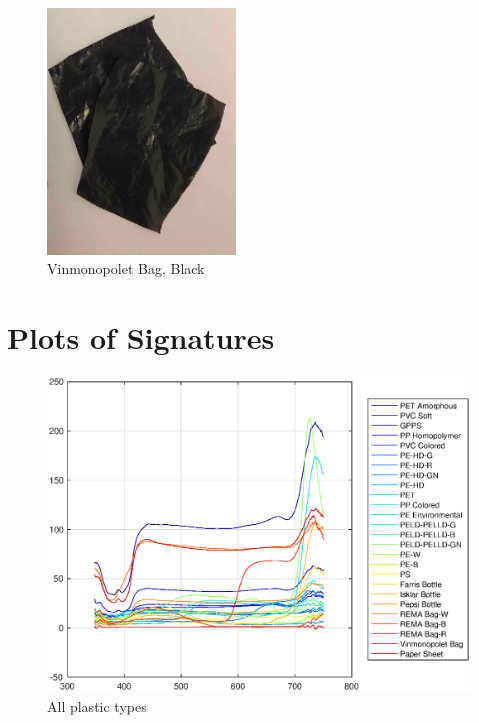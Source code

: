 \begin{appendices}
\begin{figure}
    \centering
    \includegraphics[width = 5cm]{Images/appendix/vmp.png}
    \caption[$\; \:$Vinmonopolet Bag]{Vinmonopolet Bag, Black}
    \label{fig:vinmono}
\end{figure}

















\chapter{Plots of Signatures}
\label{app:signatures}

\begin{figure}
    \centering
    \includegraphics[width = 12cm]{Images/appendix/All.eps}
    \caption{All plastic types}
    \label{fig:all}
\end{figure}


\end{appendices}
